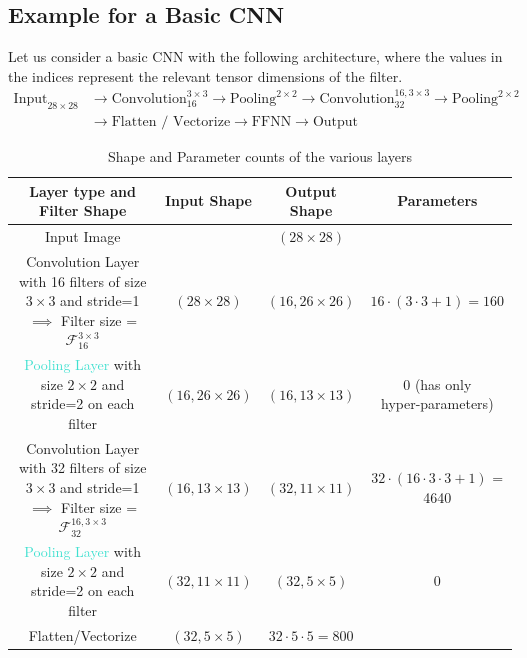 \documentclass[11pt, twosides]{article}
\begin{document}
\subsection{Example for a Basic CNN}
Let us consider a basic  CNN with the following architecture, where the values in the indices represent the relevant tensor dimensions of the filter.
\begin{align*}
  \text{Input}_{28 \times 28} &\rightarrow \text{Convolution}_{16}^{3\times3} \rightarrow \text{Pooling}^{2\times 2} \rightarrow \text{Convolution}_{32}^{16,3\times3} \rightarrow \text{Pooling}^{2 \times 2} \\
  &\rightarrow \text{Flatten / Vectorize} \rightarrow \text{FFNN} \rightarrow \text{Output}
\end{align*}
\begin{table}[H]
    \centering
    \begin{tabular}{||c||c|c|c|}
      \hline \hline Layer type and Filter Shape & Input Shape & Output Shape & Parameters \\ [0.5ex]
      \hline Input Image & & $\left(28 \times 28 \right)$ & \\
      \hline \shortstack{\textcolor{BrickRed}{Convolution Layer} with 16 filters of \\ size $3\times3$ and stride=1 $\implies$ Filter size = $ \mathcal{F}_{16}^{3\times 3} $} & $\left(28 \times 28 \right)$ & $\left(16, 26 \times 26 \right) $ & $ 16 \cdot \left( 3 \cdot 3  + 1\right)= 160 $ \\
      \hline \shortstack{\textcolor{Turquoise}{Pooling Layer} with size $2\times2$  \\ and stride=2 on each filter } & $\left(16, 26 \times 26 \right) $ & $\left(16, 13 \times 13 \right) $ & \shortstack{0 (has only \\ hyper-parameters)} \\
      \hline \shortstack{\textcolor{BrickRed}{Convolution Layer} with 32 filters of \\ size $3\times3$ and stride=1 \\ $\implies$ Filter size = $ \mathcal{F}_{32}^{16, 3\times 3} $ } & $\left(16, 13 \times 13 \right) $ & $\left(32, 11 \times 11 \right) $ & \shortstack{$ 32 \cdot \left( 16 \cdot 3 \cdot 3  + 1\right) $ \\ = 4640 }\\
      \hline \shortstack{ \textcolor{Turquoise}{Pooling Layer} with size $2\times2$ \\ and stride=2 on each filter } & $\left(32, 11 \times 11 \right) $ & $\left(32, 5 \times 5 \right) $ & 0  \\
      \hline Flatten/Vectorize  & $\left(32, 5 \times 5 \right) $ & $32 \cdot 5 \cdot 5 = 800$ &  \\
      \hline
    \end{tabular}
    \caption{Shape and Parameter counts of the various layers}
    \label{tab:my_label}
\end{table}
\end{document}
